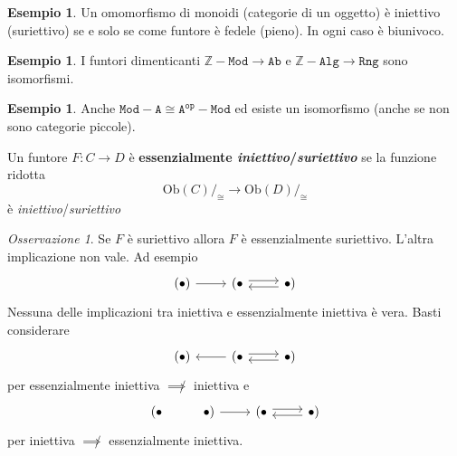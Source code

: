 \documentclass[notitlepage]{report}
\newcounter{theo}[section]\setcounter{theo}{0}
\newcounter{excounter}[section]\setcounter{excounter}{0}
\numberwithin{equation}{section}
\theoremstyle{plain}
\theoremstyle{definition}
\newtheorem{example}[excounter]{Esempio}
\theoremstyle{remark}
\newtheorem*{remark}{Osservazione}
\begin{document}
\begin{example}{}
    Un omomorfismo di monoidi (categorie di un oggetto) è iniettivo (suriettivo)
    se e solo se come funtore è fedele (pieno). In ogni caso è biunivoco.
\end{example}

\begin{example}{}
    I funtori dimenticanti \(\mathtt{\mathbb{Z}-Mod} \to \mathtt{Ab}\) e \(\mathtt{\mathbb{Z}-Alg} \to \mathtt{Rng}\) sono isomorfismi.
\end{example}

\begin{example}{}
    Anche \(\mathtt{Mod-A}\cong \mathtt{A^{op}-Mod}\) ed esiste un isomorfismo
    (anche se non sono categorie piccole).
\end{example}

\begin{definition}{}
    Un funtore \(F: C \to D\) è \textbf{essenzialmente
    \emph{iniettivo}/\emph{suriettivo}} se la funzione ridotta 
    \[
        \mathrm{Ob}{(C)}/_{\cong} \to \mathrm{Ob}{(D)}/_{\cong}
    \]
    è \emph{iniettivo}/\emph{suriettivo}
\end{definition}

\begin{remark}{}
    Se \(F\) è suriettivo allora \(F\) è essenzialmente suriettivo. L'altra
    implicazione non vale. Ad esempio
\[\begin{tikzcd}
	{(\bullet)} & {(\bullet} & {\bullet)}
	\arrow[from=1-1, to=1-2]
	\arrow[shift left, from=1-2, to=1-3]
	\arrow[shift left, from=1-3, to=1-2]
\end{tikzcd}\]
    Nessuna delle implicazioni tra iniettiva e essenzialmente iniettiva è vera.
    Basti considerare
\[\begin{tikzcd}
	{(\bullet)} & {(\bullet} & {\bullet)}
	\arrow[from=1-2, to=1-1]
	\arrow[shift left, from=1-2, to=1-3]
	\arrow[shift left, from=1-3, to=1-2]
\end{tikzcd}\]
    per essenzialmente iniettiva \(\not\implies\) iniettiva
    e
\[\begin{tikzcd}
	{(\bullet} & {\bullet)} & {(\bullet} & {\bullet)}
	\arrow[from=1-2, to=1-3]
	\arrow[shift left, from=1-3, to=1-4]
	\arrow[shift left, from=1-4, to=1-3]
\end{tikzcd}\]
    per iniettiva \(\not\implies \) essenzialmente iniettiva.
\end{remark}
\end{document}
